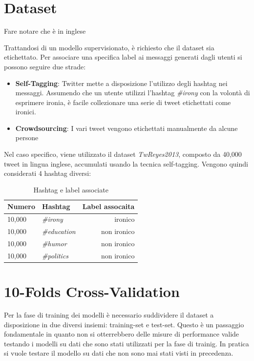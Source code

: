 \documentclass[oneside]{book}
\begin{document}
\section{Dataset}
Fare notare che è in inglese

Trattandosi di un modello supervisionato, è richiesto che il dataset sia etichettato. Per associare una specifica label ai messaggi generati dagli utenti si possono seguire due strade:

\begin{itemize}
	\item \textbf{Self-Tagging}:
	\label{chap:self-taggin}
	Twitter mette a disposizione l'utilizzo degli hashtag nei messaggi. Assumendo che un utente utilizzi l'hashtag \emph{\#irony} con la volontà di esprimere ironia, è facile collezionare una serie di tweet etichettati come ironici.
	
	\item \textbf{Crowdsourcing}:	
	I vari tweet vengono etichettati manualmente da alcune persone
\end{itemize}

Nel caso specifico, viene utilizzato il dataset \emph{TwReyes2013}, composto da 40,000 tweet in lingua inglese, accumulati usando la tecnica self-tagging. Vengono quindi considerati 4 hashtag diversi:


\begin{table}[ht]
	\centering
	\begin{tabular}[t]{llr}
		\hline
		\textbf{Numero} & \textbf{Hashtag}  & \textbf{Label assocaita}\\
		\hline
		10,000 & \emph{\#irony}     & ironico     \\
		10,000 & \emph{\#education} & non ironico \\
		10,000 & \emph{\#humor}     & non ironico \\
		10,000 & \emph{\#politics}  & non ironico \\
		\hline
	\end{tabular}
	\caption{Hashtag e label associate}
\end{table}%

\section{10-Folds Cross-Validation}
Per la fase di training dei modelli è necessario suddividere il dataset a disposizione in due diversi insiemi: training-set e test-set. Questo è un passaggio fondamentale in quanto non si otterrebbero delle misure di performance valide testando i modelli su dati che sono stati utilizzati per la fase di trainig. In pratica si vuole testare il modello su dati che non sono mai stati visti in precedenza.
\end{document}
